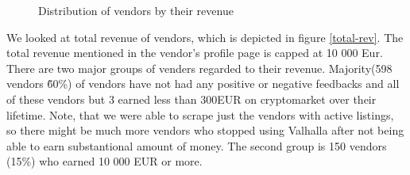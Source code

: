 \documentclass[
  digital, %
  table,   %
  lof,     %
  lot,     %
  oneside
]{fithesis3}
\begin{document}
\begin{figure}[!htb]

    
\caption{Distribution  of vendors by their revenue}
\end{figure}



We looked at total revenue of vendors, which is depicted in figure \ref{total-rev}. 
The total revenue mentioned in the vendor's profile page is capped at 10 000 Eur.
There are two major groups of venders regarded to their revenue. 
Majority(598 vendors \~ 60\%) of vendors have not had any positive or negative feedbacks and all of these vendors
but 3 earned less than 300EUR on cryptomarket over their lifetime.
Note, that we were able to scrape just the vendors with active listings,
so there might be much more vendors who stopped using Valhalla after
not being able to earn substantional amount of money.
The second group is 150 vendors (15\%) who earned 10 000 EUR or more.
\end{document}
